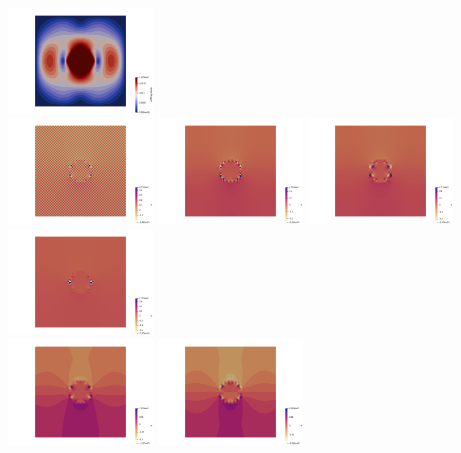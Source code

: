 \begin{center}
\includegraphics[width=3.84cm]{python_codes/fieldstone_78/results/sphere/vel3}\\
\includegraphics[width=3.84cm]{python_codes/fieldstone_78/results/sphere/p0}
\includegraphics[width=3.84cm]{python_codes/fieldstone_78/results/sphere/p1}
\includegraphics[width=3.84cm]{python_codes/fieldstone_78/results/sphere/p2}
\includegraphics[width=3.84cm]{python_codes/fieldstone_78/results/sphere/p3}\\
\includegraphics[width=3.84cm]{python_codes/fieldstone_78/results/sphere/q0}
\includegraphics[width=3.84cm]{python_codes/fieldstone_78/results/sphere/q1}

\end{center}
